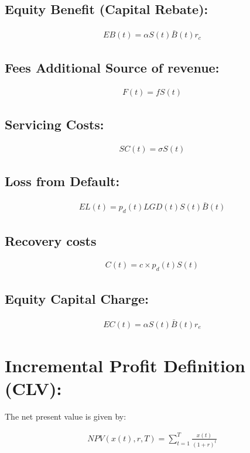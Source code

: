 \subsection{ Equity Benefit (Capital Rebate): }
\begin{align}
EB(t) = \alpha S(t)\bar{ B}(t) r_c
\end{align}

\subsection{ Fees Additional Source of revenue: }
\begin{align}
F(t) = f S(t)
\end{align}

\subsection{ Servicing Costs: }
\begin{align}
SC(t) =  \sigma S(t)
\end{align}

\subsection{ Loss from Default: }
\begin{align}
EL(t) =  p_d(t)LGD(t)S(t)\bar{ B}(t) 
\end{align}
\subsection{Recovery costs}
\begin{align}
C(t) = c\times p_d(t) S(t)
\end{align}

\subsection{ Equity Capital Charge: }
\begin{align}
 EC(t) =  \alpha S(t)\bar{ B}(t) r_e
\end{align}


\section{ Incremental Profit Definition (CLV): }
The net present value is given by:

\begin{align}
NPV(x(t),r,T)=\sum_{t=1}^T \frac{x(t)}{(1+r)^t}
\end{align}

